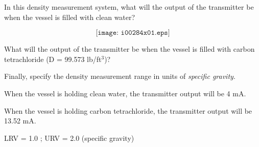 

In this density measurement system, what will the output of the transmitter be when the vessel is filled with clean water?

$$\texttt{[image: i00284x01.eps]}$$

What will the output of the transmitter be when the vessel is filled with carbon tetrachloride (D = 99.573 lb/ft$^{3}$)?

\vskip 10pt

Finally, specify the density measurement range in units of {\it specific gravity}.







When the vessel is holding clean water, the transmitter output will be 4 mA.

\vskip 10pt

When the vessel is holding carbon tetrachloride, the transmitter output will be 13.52 mA.

\vskip 10pt

LRV = 1.0 ; URV = 2.0 (specific gravity)











